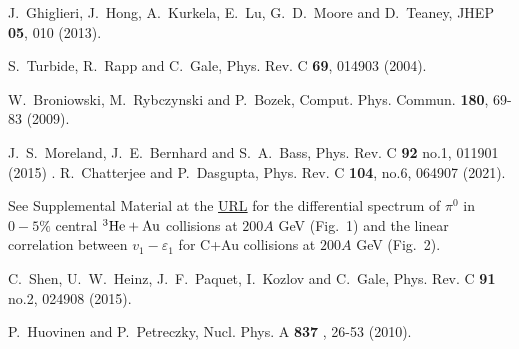 \documentclass[aps,prc,twocolumn,floatfix,12pts,superscriptaddress]{revtex4}
\begin{document}
{{\begin{thebibliography}{99}
J.~Ghiglieri, J.~Hong, A.~Kurkela, E.~Lu, G.~D.~Moore and D.~Teaney,
JHEP \textbf{05}, 010 (2013).

S.~Turbide, R.~Rapp and C.~Gale,
Phys. Rev. C \textbf{69}, 014903 (2004).

W.~Broniowski, M.~Rybczynski and P.~Bozek,
Comput. Phys. Commun. \textbf{180}, 69-83 (2009).

{
J.~S.~Moreland, J.~E.~Bernhard and S.~A.~Bass,
Phys. Rev. C \textbf{92} no.1, 011901 (2015) .
}
R.~Chatterjee and P.~Dasgupta,
Phys. Rev. C \textbf{104}, no.6, 064907 (2021).

 See Supplemental Material at the \href{https://journals.aps.org/prc/supplemental/10.1103/PhysRevC.107.044908/SupplementalMaterial.pdf}{URL} for the differential spectrum of $\pi^0$ in $0-5\%$ central $\rm ^3He+Au$ collisions at $200A$ GeV (Fig.~1) and the linear correlation between $v_1-\varepsilon_1$ for C+Au collisions at $200A$ GeV (Fig.~2).

{
C.~Shen, U.~W.~Heinz, J.~F.~Paquet, I.~Kozlov and C.~Gale,
Phys. Rev. C \textbf{91}  no.2, 024908 (2015).

P.~Huovinen and P.~Petreczky,
Nucl. Phys. A \textbf{837} , 26-53 (2010).


}
\end{thebibliography}}}
\end{document}
